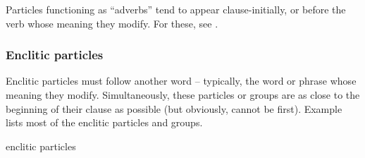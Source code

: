 Particles functioning as “adverbs” tend to appear clause-initially, or before the verb whose meaning they modify. For these, see .


\subsubsection*{Enclitic particles}

Enclitic particles must follow another word -- typically, the word or phrase whose meaning they modify. Simultaneously, these particles or groups are as close to the beginning of their clause as possible (but obviously, cannot be first). Example  lists most of the enclitic particles and groups.

\ea
\label{ex:particleclauseorder3}

enclitic particles 

